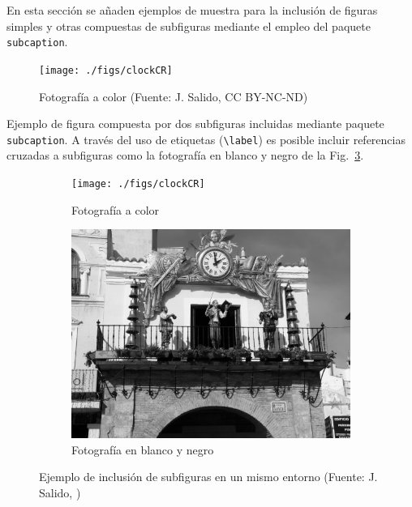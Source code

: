 En esta sección se añaden ejemplos de muestra para la inclusión de 
figuras simples y otras compuestas de subfiguras mediante el empleo del paquete \texttt{subcaption}.

\begin{figure}[H] %
	\centering
	\texttt{[image: ./figs/clockCR]}
	\caption[Ejemplo de figura]{Fotografía a color 
	(Fuente: J. Salido, CC BY-NC-ND)}
	\label{fig:ejFigure}
\end{figure}


\noindent Ejemplo de figura compuesta por dos subfiguras incluidas mediante paquete \texttt{subcaption}. A través del uso de etiquetas (\texttt{\textbackslash label}) es posible incluir referencias cruzadas a subfiguras como la fotografía en blanco y negro de la Fig.~\ref{fig:fotoBW}.


\begin{figure}[H] %
	\centering
	\begin{subfigure}[b]{0.4\linewidth}
		\centering
		\texttt{[image: ./figs/clockCR]}
		\caption{Fotografía a color}\label{fig:fotocolor}
	\end{subfigure} 
	\begin{subfigure}[b]{0.4\linewidth}
		\centering
		\includegraphics[width=0.8\linewidth]{./figs/clockCRbw}
		\caption{Fotografía en blanco y negro}\label{fig:fotoBW}
	\end{subfigure} 
	\caption[Ejemplo de subfiguras]{Ejemplo de inclusión de subfiguras en un mismo entorno (Fuente: J. Salido, \faCreativeCommons{} \faCreativeCommonsBy{} \faCreativeCommonsNcEu{} \faCreativeCommonsNd)}
	\label{fig:ejSubfigures}
\end{figure}

